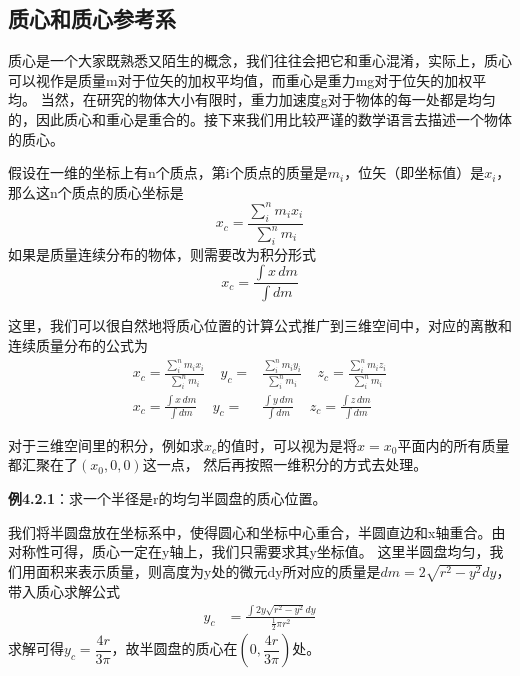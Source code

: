 \documentclass{article}
\begin{document}
    \subsection{质心和质心参考系}
    质心是一个大家既熟悉又陌生的概念，我们往往会把它和重心混淆，实际上，质心可以视作是质量m对于位矢的加权平均值，而重心是重力mg对于位矢的加权平均。
    当然，在研究的物体大小有限时，重力加速度g对于物体的每一处都是均匀的，因此质心和重心是重合的。接下来我们用比较严谨的数学语言去描述一个物体的质心。

    假设在一维的坐标上有n个质点，第i个质点的质量是\(m_i\)，位矢（即坐标值）是\(x_i\)，那么这n个质点的质心坐标是
    \begin{equation*}
        x_c = \frac{\displaystyle \sum_i^n m_i x_i}{\displaystyle \sum_i^n m_i}
    \end{equation*}
    如果是质量连续分布的物体，则需要改为积分形式
    \begin{equation*}
        x_c = \frac{\int x \, dm}{\int  dm}
    \end{equation*}

    这里，我们可以很自然地将质心位置的计算公式推广到三维空间中，对应的离散和连续质量分布的公式为
    \begin{align*}
        x_c = \frac{\displaystyle \sum_i^n m_i x_i}{\displaystyle \sum_i^n m_i}\ \ \ \ \ y_c =& \frac{\displaystyle \sum_i^n m_i y_i}{\displaystyle \sum_i^n m_i}\ \ \ \ \ z_c = \frac{\displaystyle \sum_i^n m_i z_i}{\displaystyle \sum_i^n m_i} \\
        x_c = \frac{\int x \, dm}{\int  dm}\ \ \ \ \ y_c =& \frac{\int y \, dm}{\int  dm}\ \ \ \ \ z_c = \frac{\int z \, dm}{\int  dm}
    \end{align*}

    对于三维空间里的积分，例如求\(x_c\)的值时，可以视为是将\(x=x_0\)平面内的所有质量都汇聚在了\((x_0,0,0)\)这一点，
    然后再按照一维积分的方式去处理。

    \textbf{例4.2.1}：求一个半径是r的均匀半圆盘的质心位置。

    我们将半圆盘放在坐标系中，使得圆心和坐标中心重合，半圆直边和x轴重合。由对称性可得，质心一定在y轴上，我们只需要求其y坐标值。
    这里半圆盘均匀，我们用面积来表示质量，则高度为y处的微元dy所对应的质量是\(dm = 2\sqrt{r^2 - y^2}dy\)，带入质心求解公式
    \begin{align*}
        y_c &= \frac{\int 2y\sqrt{r^2 - y^2}dy }{\frac{1}{2}\pi r^2 }
    \end{align*}
    求解可得\(y_c = \dfrac{4r}{3\pi}\)，故半圆盘的质心在\((0,\dfrac{4r}{3\pi})\)处。
\end{document}
